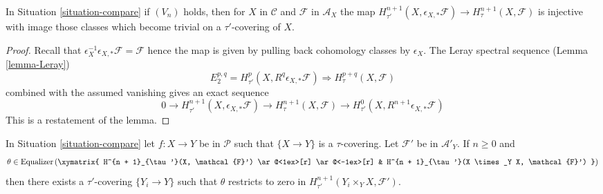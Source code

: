 \begin{lemma}
\label{lemma-V-implies-cohomology-extra-general}
In Situation \ref{situation-compare} if $(V_n)$ holds, then for
$X$ in $\mathcal{C}$ and $\mathcal{F}$ in $\mathcal{A}_X$ the map
$H^{n + 1}_{\tau'}(X, \epsilon_{X, *}\mathcal{F}) \to
H^{n + 1}_\tau(X, \mathcal{F})$
is injective with image those classes which become trivial on
a $\tau'$-covering of $X$.
\end{lemma}

\begin{proof}
Recall that $\epsilon_X^{-1}\epsilon_{X, *}\mathcal{F} = \mathcal{F}$
hence the map is given by pulling back cohomology classes
by $\epsilon_X$. The Leray spectral sequence (Lemma \ref{lemma-Leray})
$$
E_2^{p, q} = H^p_{\tau'}(X, R^q\epsilon_{X, *}\mathcal{F})
\Rightarrow
H^{p + q}_\tau(X, \mathcal{F})
$$
combined with the assumed vanishing gives an exact sequence
$$
0 \to
H^{n + 1}_{\tau'}(X, \epsilon_{X, *}\mathcal{F}) \to
H^{n + 1}_\tau(X, \mathcal{F}) \to
H^0_{\tau'}(X, R^{n + 1}\epsilon_{X, *}\mathcal{F})
$$
This is a restatement of the lemma.
\end{proof}

\begin{lemma}
\label{lemma-make-class-zero-general}
In Situation \ref{situation-compare} let $f : X \to Y$
be in $\mathcal{P}$ such that $\{X \to Y\}$ is a $\tau$-covering.
Let $\mathcal{F}'$ be in $\mathcal{A}'_Y$. If $n \geq 0$ and
$$
\theta \in
\text{Equalizer}\left(
\xymatrix{
H^{n + 1}_{\tau'}(X, \mathcal{F}')
\ar@<1ex>[r] \ar@<-1ex>[r] &
H^{n + 1}_{\tau'}(X \times_Y X, \mathcal{F}')
}
\right)
$$
then there exists a $\tau'$-covering $\{Y_i \to Y\}$
such that $\theta$ restricts to zero in
$H^{n + 1}_{\tau'}(Y_i \times_Y X, \mathcal{F}')$.
\end{lemma}

